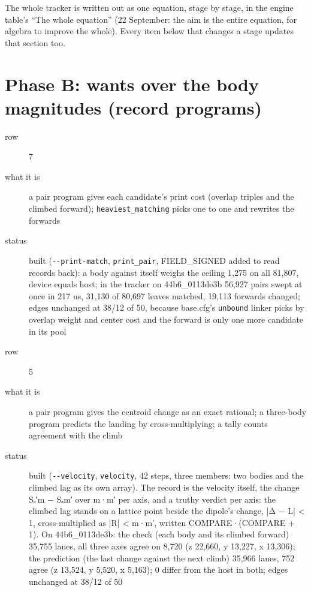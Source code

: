 The whole tracker is written out as one equation, stage by stage, in the engine table's “The whole equation” (22 September: the aim is the entire equation, for algebra to improve the whole). Every item below that changes a stage updates that section too.

\section{\texorpdfstring{Phase B: wants over the body magnitudes (record programs)}{Phase B: wants over the body magnitudes (record programs)}}

\begin{description}
\item[{row}] 7
\item[{what it is}] a pair program gives each candidate's print cost (overlap triples and the climbed forward); \texttt{heaviest\_\allowbreak{}matching} picks one to one and rewrites the forwards
\item[{status}] built (\texttt{-\allowbreak{}-\allowbreak{}print-\allowbreak{}match}, \texttt{print\_\allowbreak{}pair}, FIELD\_\allowbreak{}SIGNED added to read records back): a body against itself weighs the ceiling 1,275 on all 81,807, device equals host; in the tracker on 44b6\_\allowbreak{}0113de3b 56,927 pairs swept at once in 217 us, 31,130 of 80,697 leaves matched, 19,113 forwards changed; edges unchanged at 38/12 of 50, because base.cfg's \texttt{unbound} linker picks by overlap weight and center cost and the forward is only one more candidate in its pool
\end{description}

\begin{description}
\item[{row}] 5
\item[{what it is}] a pair program gives the centroid change as an exact rational; a three-body program predicts the landing by cross-multiplying; a tally counts agreement with the climb
\item[{status}] built (\texttt{-\allowbreak{}-\allowbreak{}velocity}, \texttt{velocity}, 42 steps, three members: two bodies and the climbed lag as its own array). The record is the velocity itself, the change Sₐ′m − Sₐm′ over m·m′ per axis, and a truthy verdict per axis: the climbed lag stands on a lattice point beside the dipole's change, |Δ − L| < 1, cross-multiplied as |R| < m·m′, written COMPARE·(COMPARE + 1). On 44b6\_\allowbreak{}0113de3b: the check (each body and its climbed forward) 35,755 lanes, all three axes agree on 8,720 (z 22,660, y 13,227, x 13,306); the prediction (the last change against the next climb) 35,966 lanes, 752 agree (z 13,524, y 5,520, x 5,163); 0 differ from the host in both; edges unchanged at 38/12 of 50
\end{description}

